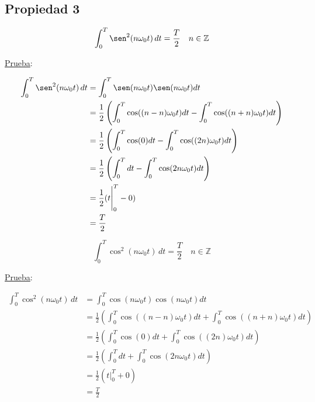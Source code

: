 \subsection*{Propiedad 3}

\begin{equation}
    \int_{0}^{T}\sen^2(n\omega_0 t)\,dt=\frac{T}{2}\quad n \in\mathbb{Z}
\end{equation}

\underline{Prueba}:

\begin{equation*}
\begin{split}
    \int_{0}^{T}\sen^2(n\omega_0 t)\,dt
        &=\int_{0}^{T}\sen(n\omega_0 t)\sen(n\omega_0 t)dt\\
        &=\frac{1}{2}\left(\int_{0}^{T}\cos((n-n)\omega_0 t)dt-
          \int_{0}^{T}\cos((n+n)\omega_0 t)dt\right)\\
        &=\frac{1}{2}\left(\int_{0}^{T}\cos(0)dt-
          \int_{0}^{T}\cos((2n)\omega_0 t)dt\right)\\
        &=\frac{1}{2}\left(\int_{0}^{T}dt-
          \int_{0}^{T}\cos(2n\omega_0 t)dt\right)\\
        &=\frac{1}{2}(t\Biggr|_0^T-0)\\
        &=\frac{T}{2}\\
\end{split}
\end{equation*}

\begin{equation}
    \int_{0}^{T}\cos^2(n\omega_0 t)\,dt=\frac{T}{2}\quad n \in\mathbb{Z}
\end{equation}

\underline{Prueba}:

\begin{equation*}
\begin{split}
    \int_{0}^{T}\cos^2(n\omega_0 t)\,dt
        &=\int_{0}^{T}\cos(n\omega_0 t)\cos(n\omega_0 t)dt\\
        &=\frac{1}{2}\left(\int_{0}^{T}\cos((n-n)\omega_0 t)dt+
          \int_{0}^{T}\cos((n+n)\omega_0 t)dt\right)\\
        &=\frac{1}{2}\left(\int_{0}^{T}\cos(0)dt+
          \int_{0}^{T}\cos((2n)\omega_0 t)dt\right)\\
        &=\frac{1}{2}\left(\int_{0}^{T}dt+
          \int_{0}^{T}\cos(2n\omega_0 t)dt\right)\\
        &=\frac{1}{2}(t\Biggr|_0^T+0)\\
        &=\frac{T}{2}\\
\end{split}
\end{equation*}

